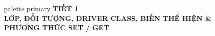 \documentclass[aspectratio=169, 10pt]{beamer}
\begin{document}
\begin{frame}[plain]
  \vfill
  \centering
  \begin{beamercolorbox}[sep=8pt,center,shadow=true,rounded=true]{palette primary}
    {\Huge \textbf{TIẾT 1}}\\[2mm]
    {\Large \textbf{LỚP, ĐỐI TƯỢNG, DRIVER CLASS, BIẾN THỂ HIỆN \& PHƯƠNG THỨC SET / GET}}
  \end{beamercolorbox}
  \vfill
\end{frame}

\end{document}
